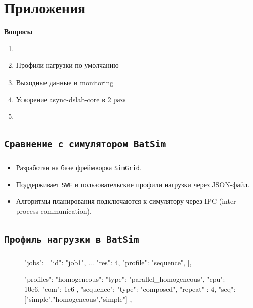 \documentclass[t]{beamer}  %
\begin{document}
	\section{Приложения}
	
	\begin{frame}{\textbf{Вопросы}}
	
		\begin{enumerate}
			\item \hyperlink{drf-fairness}{}
			\item Профили нагрузки по умолчанию 
			\item Выходные данные и monitoring 
			\item Ускорение async-dslab-core в 2 раза 
			\item \hyperlink{dsmodeling}{} 
		\end{enumerate}
	\end{frame}

	\subsection{\texttt{Сравнение с симулятором \texttt{BatSim}}}\label{batsim-compare}

	\begin{frame}[fragile]
		\frametitle{\insertsection} 
		\framesubtitle{\insertsubsection}
		\vspace{1cm}	
		\begin{itemize}
			\item Разработан на базе фреймворка \texttt{SimGrid}.
			\item Поддерживает \texttt{SWF} и пользовательские профили нагрузки через JSON-файл.
			\item Алгоритмы планирования подключаются к симулятору через IPC (inter-process-communication).
		\end{itemize}
		\end{frame}


	\subsection{\texttt{Профиль нагрузки в BatSim}}
	\begin{frame}[fragile]
		\frametitle{\insertsection} 
		\framesubtitle{\insertsubsection}
		\begin{figure}
			\scriptsize
		\begin{jsoncode}
"jobs": [
  {"id": "job1",  ...  "res": 4, "profile": "sequence"},
],

"profiles": {
  "homogeneous": {
    "type": "parallel_homogeneous",
    "cpu": 10e6,
    "com": 1e6
  },
  "sequence": {
    "type": "composed",
    "repeat" : 4,
    "seq": ["simple","homogeneous","simple"]
  },
}
		\end{jsoncode}
	\end{figure}
	\end{frame}
\end{document}
